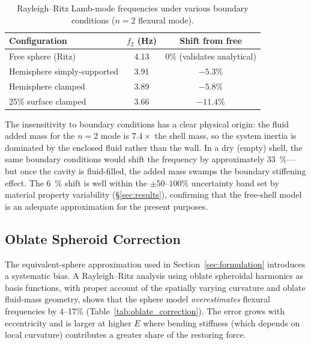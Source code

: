 \begin{table}[htbp]
  \centering
  \caption{Rayleigh--Ritz Lamb-mode frequencies under various boundary
  conditions ($n=2$ flexural mode).}
  \label{tab:bc_results}
  \begin{tabular}{lcc}
    \toprule
    Configuration & $f_2$ (Hz) & Shift from free \\
    \midrule
    Free sphere (Ritz) & 4.13 & 0\% (validates analytical) \\
    Hemisphere simply-supported & 3.91 & $-5.3\%$ \\
    Hemisphere clamped & 3.89 & $-5.8\%$ \\
    25\% surface clamped & 3.66 & $-11.4\%$ \\
    \bottomrule
  \end{tabular}
\end{table}

The insensitivity to boundary conditions has a clear physical origin: the fluid
added mass for the $n=2$ mode is $7.4\times$ the shell mass, so the system
inertia is dominated by the enclosed fluid rather than the wall.  In a dry
(empty) shell, the same boundary conditions would shift the frequency by
approximately \SI{33}{\percent}---but once the cavity is fluid-filled, the
added mass swamps the boundary stiffening effect.  The \SI{6}{\percent} shift
is well within the $\pm 50$--$100\%$ uncertainty band set by material property
variability (\S\ref{sec:results}), confirming that the free-shell model is an
adequate approximation for the present purposes.

\subsection{Oblate Spheroid Correction}

The equivalent-sphere approximation used in Section~\ref{sec:formulation}
introduces a systematic bias.  A Rayleigh--Ritz analysis using oblate
spheroidal harmonics as basis functions, with proper account of the
spatially varying curvature and oblate fluid-mass geometry, shows that the
sphere model \emph{overestimates} flexural frequencies by 4--17\%
(Table~\ref{tab:oblate_correction}).  The error grows with eccentricity and
is larger at higher $E$ where bending stiffness (which depends on local
curvature) contributes a greater share of the restoring force.

